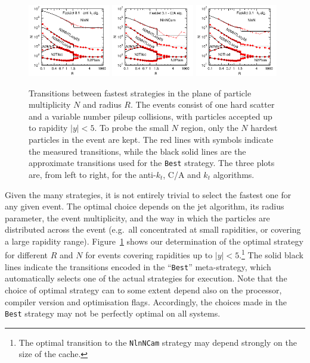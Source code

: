 \documentclass[12pt,a4]{article}
\newcommand{\ttt}[1]{{\small\texttt{#1}}}
\begin{document}
\begin{figure}[tp]
  \centering
  \includegraphics[width=0.32\textwidth]{figs/fj31-best-strategy-manual-akt}\hfill
  \includegraphics[width=0.32\textwidth]{figs/fj31-best-strategy-manual-cam}\hfill
  \includegraphics[width=0.32\textwidth]{figs/fj31-best-strategy-manual-kt}
  \caption{Transitions between fastest strategies in the plane of
    particle multiplicity $N$ and radius $R$. 
    The events consist of
    one hard scatter and a variable number pileup collisions, with
    particles accepted up to rapidity $|y|<5$. 
    To probe the small $N$
    region, only the $N$ hardest particles in the event are kept.
    The red lines with symbols indicate the measured transitions,
    while the black solid lines are the approximate transitions used
    for the \texttt{Best} strategy.
    The three plots are, from left to right, for the anti-$k_t$, C/A and
    $k_t$ algorithms.
  }
  \label{fig:optimal-strategy}
\end{figure}


Given the many strategies, it is not entirely trivial to select the
fastest one for any given event.
%
The optimal choice depends on the jet algorithm, its radius parameter,
the event multiplicity, and the way in which the particles are
distributed across the event (e.g.\ all concentrated at small
rapidities, or covering a large rapidity range).
%
Figure~\ref{fig:optimal-strategy} shows our determination of the
optimal strategy for different $R$ and $N$ for events covering
rapidities up to $|y|<5$.\footnote{The optimal transition to the
  \ttt{NlnNCam} strategy may depend strongly on the size of the
  cache.}
%
The solid black lines indicate the transitions encoded in the
``\ttt{Best}'' meta-strategy, which automatically selects one of the
actual strategies for execution.
%
Note that the choice of optimal strategy can to some extent depend
also on the processor, compiler version and optimisation flags.
%
Accordingly, the choices made in the \ttt{Best} strategy may not be
perfectly optimal on all systems.
\end{document}

